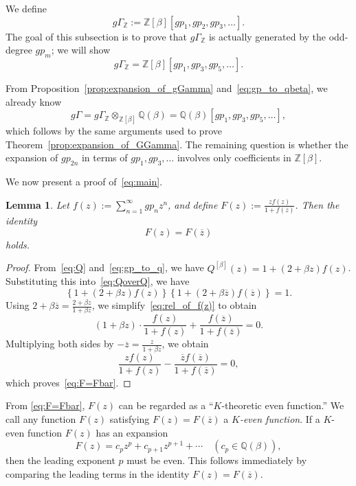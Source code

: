 \documentclass[dvipdfmx]{amsart}
\newtheorem{lemma}[thm]{Lemma}
\theoremstyle{definition}
\theoremstyle{remark}
\begin{document}
We define
\[
g\Gamma_{\mathbb{Z}} := \mathbb{Z}[\beta][gp_1, gp_2, gp_3, \dots].
\]
The goal of this subsection is to prove that \( g\Gamma_{\mathbb{Z}} \) is actually generated by the odd-degree \( gp_m \); we will show
\begin{equation}\label{eq:main}
g\Gamma_{\mathbb{Z}} = \mathbb{Z}[\beta][gp_1, gp_3, gp_5, \dots].
\end{equation}

From Proposition~\ref{prop:expansion_of_gGamma} and~\eqref{eq:gp_to_qbeta}, we already know
\[
g\Gamma = 
g\Gamma_{\mathbb{Z}} \otimes_{\mathbb{Z}[\beta]} \mathbb{Q}(\beta) 
= \mathbb{Q}(\beta)[gp_1, gp_3, gp_5, \dots],
\]
which follows by the same arguments used to prove Theorem~\ref{prop:expansion_of_GGamma}.  
The remaining question is whether the expansion of \( gp_{2n} \) in terms of \( gp_1, gp_3, \dots \) involves only coefficients in \( \mathbb{Z}[\beta] \).

We now present a proof of~\eqref{eq:main}.

\begin{lemma}\label{lemma:K-expansion}
Let \( f(z) := \sum_{n=1}^\infty gp_n z^n \), and define \( F(z) := \frac{z f(z)}{1 + f(z)} \). Then the identity
\begin{equation}\label{eq:F=Fbar}
F(z) = F(\overline{z})
\end{equation}
holds.
\end{lemma}

\begin{proof}
From~\eqref{eq:Q} and~\eqref{eq:gp_to_q}, we have \( Q^{[\beta]}(z) = 1 + (2 + \beta z) f(z) \).  
Substituting this into~\eqref{eq:QoverQ}, we have
\begin{equation}\label{eq:rel_of_f(z)}
\left\{ 1 + (2 + \beta z) f(z) \right\} \left\{ 1 + (2 + \beta \overline{z}) f(\overline{z}) \right\} = 1.
\end{equation}
Using \( 2 + \beta \overline{z} = \frac{2 + \beta z}{1 + \beta z} \), we simplify~\eqref{eq:rel_of_f(z)} to obtain
\[
(1 + \beta z) \cdot \frac{f(z)}{1 + f(z)} + \frac{f(\overline{z})}{1 + f(\overline{z})} = 0.
\]
Multiplying both sides by \( -\overline{z} = \frac{z}{1 + \beta z} \), we obtain
\[
\frac{z f(z)}{1 + f(z)} - \frac{\overline{z} f(\overline{z})}{1 + f(\overline{z})} = 0,
\]
which proves~\eqref{eq:F=Fbar}.
\end{proof}

From \eqref{eq:F=Fbar}, $F(z)$ can be regarded as a ``$K$-theoretic even function.''
We call any function \( F(z) \) satisfying \( F(z) = F(\overline{z}) \) a \textit{\( K \)-even function}.
If a \( K \)-even function $F(z)$ has an expansion
\[
F(z) = c_p z^p + c_{p+1} z^{p+1} + \cdots \quad (c_p \in \mathbb{Q}(\beta)),
\]
then the leading exponent \( p \) must be even.  
This follows immediately by comparing the leading terms in the identity \( F(z) = F(\overline{z}) \).
\end{document}
